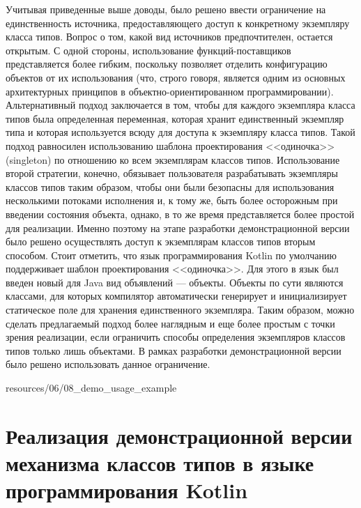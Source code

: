 Учитывая приведенные выше доводы, было решено ввести ограничение на единственность источника, предоставляющего доступ к конкретному экземпляру класса типов. Вопрос о том, какой вид источников предпочтителен, остается открытым. С одной стороны, использование функций-поставщиков представляется более гибким, поскольку позволяет отделить конфигурацию объектов от их использования (что, строго говоря, является одним из основных архитектурных принципов в объектно-ориентированном программировании). Альтернативный подход заключается в том, чтобы для каждого экземпляра класса типов была определенная переменная, которая хранит единственный экземпляр типа и которая используется всюду для доступа к экземпляру класса типов. Такой подход равносилен использованию шаблона проектирования <<одиночка>> (singleton) по отношению ко всем экземплярам классов типов. Использование второй стратегии, конечно, обязывает пользователя разрабатывать экземпляры классов типов таким образом, чтобы они были безопасны для использования несколькими потоками исполнения и, к тому же, быть более осторожным при введении состояния объекта, однако, в то же время представляется более простой для реализации. Именно поэтому на этапе разработки демонстрационной версии было решено осуществлять доступ к экземплярам классов типов вторым способом. Стоит отметить, что язык программирования Kotlin по умолчанию поддерживает шаблон проектирования <<одиночка>>. Для этого в язык был введен новый для Java вид объявлений --- объекты. Объекты по сути являются классами, для которых компилятор автоматически генерирует и инициализирует статическое поле для хранения единственного экземпляра. Таким образом, можно сделать предлагаемый подход более наглядным и еще более простым с точки зрения реализации, если ограничить способы определения экземпляров классов типов только лишь объектами. В рамках разработки демонстрационной версии было решено использовать данное ограничение. 


{resources/06/08_demo_usage_example}

\section{Реализация демонстрационной версии механизма классов типов в языке программирования Kotlin}

